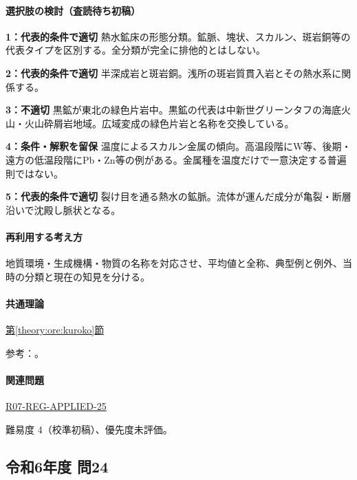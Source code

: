 \paragraph{選択肢の検討（査読待ち初稿）}\mbox{}\par

\noindent\textbf{1：代表的条件で適切} 熱水鉱床の形態分類。鉱脈、塊状、スカルン、斑岩銅等の代表タイプを区別する。全分類が完全に排他的とはしない。\par

\noindent\textbf{2：代表的条件で適切} 半深成岩と斑岩銅。浅所の斑岩質貫入岩とその熱水系に関係する。\par

\noindent\textbf{3：不適切} 黒鉱が東北の緑色片岩中。黒鉱の代表は中新世グリーンタフの海底火山・火山砕屑岩地域。広域変成の緑色片岩と名称を交換している。\par

\noindent\textbf{4：条件・解釈を留保} 温度によるスカルン金属の傾向。高温段階にW等、後期・遠方の低温段階にPb・Zn等の例がある。金属種を温度だけで一意決定する普遍則ではない。\par

\noindent\textbf{5：代表的条件で適切} 裂け目を通る熱水の鉱脈。流体が運んだ成分が亀裂・断層沿いで沈殿し脈状となる。\par

\paragraph{再利用する考え方} 地質環境・生成機構・物質の名称を対応させ、平均値と全称、典型例と例外、当時の分類と現在の知見を分ける。

\paragraph{共通理論} \hyperref[theory:ore:kuroko]{第\ref*{theory:ore:kuroko}節}

\par 参考：\cite{ore50_kuroko_ref,ore50_skarn_ref,ore50_porphyry_ref}。

\paragraph{関連問題} \hyperref[q:r07-reg-applied-25]{R07-REG-APPLIED-25}

\par 難易度 4（校準初稿）、優先度未評価。

\subsection{令和6年度 問24}
\label{q:r06-reg-applied-24}

